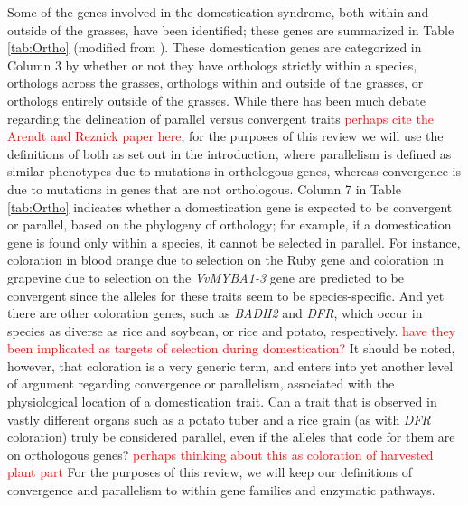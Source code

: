 \documentclass[12pt]{article}
\newcommand{\mbh}[1]{\textcolor{red}{\normalsize  #1}}
\begin{document}
Some of the genes involved in the domestication syndrome, both within and outside of the grasses, have been identified; these genes are summarized in Table \ref{tab:Ortho} (modified from \citep{Lenser2013}).
These domestication genes are categorized in Column 3 by whether or not they have orthologs strictly within a species, orthologs across the grasses, orthologs within and outside of the grasses, or orthologs entirely outside of the grasses.
While there has been much debate regarding the delineation of parallel versus convergent traits \mbh{perhaps cite the Arendt and Reznick paper here}, for the purposes of this review we will use the definitions of both as set out in the introduction, where parallelism is defined as similar phenotypes due to mutations in orthologous genes, whereas convergence is due to mutations in genes that are not orthologous.
Column 7 in Table \ref{tab:Ortho} indicates whether a domestication gene is expected to be convergent or parallel, based on the phylogeny of orthology; for example, if a domestication gene is found only within a species, it cannot be selected in parallel.
For instance, coloration in blood orange due to selection on the Ruby gene and coloration in grapevine due to selection on the \textit{VvMYBA1-3} gene are predicted to be convergent since the alleles for these traits seem to be species-specific.
And yet there are other coloration genes, such as \textit{BADH2} and \textit{DFR}, which occur in species as diverse as rice and soybean, or rice and potato, respectively. \mbh{have they been implicated as targets of selection during domestication?}
It should be noted, however, that coloration is a very generic term, and enters into yet another level of argument regarding convergence or parallelism, associated with the physiological location of a domestication trait.
Can a trait that is observed in vastly different organs such as a potato tuber and a rice grain (as with \textit{DFR} coloration) truly be considered parallel, even if the alleles that code for them are on orthologous genes? \mbh{perhaps thinking about this as coloration of harvested plant part}
For the purposes of this review, we will keep our definitions of convergence and parallelism to within gene families and enzymatic pathways. 
\end{document}
